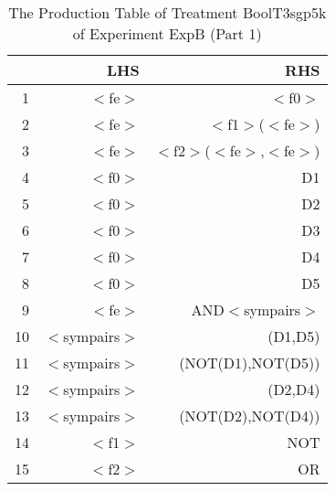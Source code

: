 \begin{table}[ht]
\centering
\begin{tabular}{rrr}
  \hline
 & LHS & RHS \\ 
  \hline
1 & $<$fe$>$ & $<$f0$>$ \\ 
  2 & $<$fe$>$ & $<$f1$>$($<$fe$>$) \\ 
  3 & $<$fe$>$ & $<$f2$>$($<$fe$>$,$<$fe$>$) \\ 
  4 & $<$f0$>$ & D1 \\ 
  5 & $<$f0$>$ & D2 \\ 
  6 & $<$f0$>$ & D3 \\ 
  7 & $<$f0$>$ & D4 \\ 
  8 & $<$f0$>$ & D5 \\ 
  9 & $<$fe$>$ & AND$<$sympairs$>$ \\ 
  10 & $<$sympairs$>$ & (D1,D5) \\ 
  11 & $<$sympairs$>$ & (NOT(D1),NOT(D5)) \\ 
  12 & $<$sympairs$>$ & (D2,D4) \\ 
  13 & $<$sympairs$>$ & (NOT(D2),NOT(D4)) \\ 
  14 & $<$f1$>$ & NOT \\ 
  15 & $<$f2$>$ & OR \\ 
   \hline
\end{tabular}
\caption{The Production Table of Treatment BoolT3sgp5k of Experiment ExpB (Part 1)} 
\end{table}
